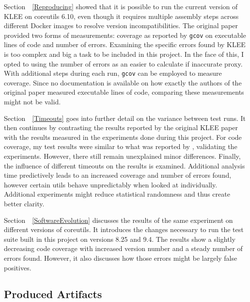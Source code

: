 \documentclass{article}
\let\savedRef=\ref
\renewcommand{\ref}{\unskip~\savedRef}
\begin{document}
Section~\ref{Reproducing} showed that it is possible to run the current version of KLEE on coreutils 6.10, even though it requires multiple assembly steps across different Docker images to resolve version incompatibilities. The original paper provided two forms of measurements: coverage as reported by \lstinline{gcov} on executable lines of code and number of errors. Examining the specific errors found by KLEE is too complex and big a task to be included in this project. In the face of this, I opted to using the number of errors as an easier to calculate if inaccurate proxy. With additional steps during each run, \lstinline{gcov} can be employed to measure coverage. Since no documentation is available on how exactly the authors of the original paper measured executable lines of code, comparing these measurements might not be valid.

Section~\ref{Timeouts} goes into further detail on the variance between test runs. It then continues by contrasting the results reported by the original KLEE paper with the results measured in the experiments done during this project. For code coverage, my test results were similar to what was reported by \citeauthor{KLEE}, validating the experiments. However, there still remain unexplained minor differences. Finally, the influence of different timeouts on the results is examined. Additional analysis time predictively leads to an increased coverage and number of errors found, however certain utils behave unpredictably when looked at individually. Additional experiments might reduce statistical randomness and thus create better clarity.

Section~\ref{SoftwareEvolution} discusses the results of the same experiment on different versions of coreutils. It introduces the changes necessary to run the test suite built in this project on versions 8.25 and 9.4. The results show a slightly decreasing code coverage with increased version number and a steady number of errors found. However, it also discusses how those errors might be largely false positives.

\subsection{Produced Artifacts}
\end{document}

